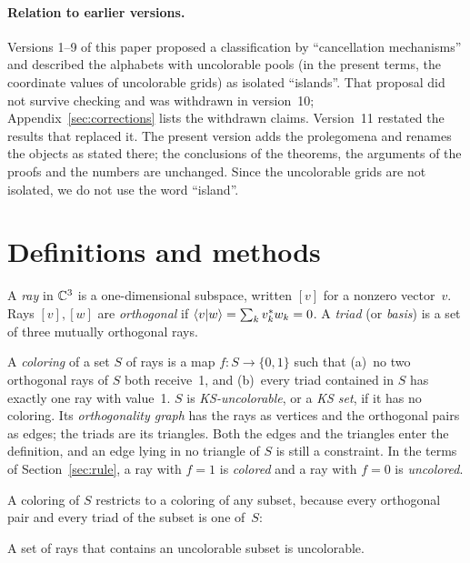 \paragraph{Relation to earlier versions.}
Versions 1--9 of this paper proposed a classification by ``cancellation mechanisms'' and
described the alphabets with uncolorable pools (in the present terms, the coordinate values of
uncolorable grids) as isolated ``islands''.  That
proposal did not survive checking and was withdrawn in version~10;
Appendix~\ref{sec:corrections} lists the withdrawn claims.  Version~11 restated the results
that replaced it.  The present version adds the prolegomena and renames the objects as stated
there; the conclusions of the theorems, the arguments of the proofs and the numbers are
unchanged.  Since the uncolorable grids are not isolated,
we do not use the word ``island''.

\section{Definitions and methods}\label{sec:prelim}

\begin{definition}
A \emph{ray} in $\mathbb{C}^3$ is a one-dimensional subspace, written $[v]$ for a nonzero vector~$v$.
Rays $[v],[w]$ are \emph{orthogonal} if $\langle v|w\rangle=\sum_k v_k^{*}w_k=0$.  A \emph{triad} (or
\emph{basis}) is a set of three mutually orthogonal rays.
\end{definition}

\begin{definition}
A \emph{coloring} of a set $S$ of rays is a map $f:S\to\{0,1\}$ such that (a)~no two orthogonal
rays of $S$ both receive~1, and (b)~every triad contained in $S$ has exactly one ray with value~1.
$S$ is \emph{KS-uncolorable}, or a \emph{KS set}, if it has no coloring.  Its \emph{orthogonality
graph} has the rays as vertices and the orthogonal pairs as edges; the triads are its triangles.
Both the edges and the triangles enter the definition, and an edge lying in no triangle of $S$
is still a constraint.  In the terms of Section~\ref{sec:rule}, a ray with $f=1$ is
\emph{colored} and a ray with $f=0$ is \emph{uncolored}.
\end{definition}

A coloring of $S$ restricts to a coloring of any subset, because every orthogonal pair and every
triad of the subset is one of~$S$:

\begin{lemma}[Restriction]\label{lem:restrict}
A set of rays that contains an uncolorable subset is uncolorable.
\end{lemma}

